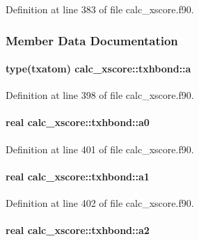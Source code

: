 Definition at line 383 of file calc\-\_\-xscore.\-f90.



\subsubsection{Member Data Documentation}
\hypertarget{structcalc__xscore_1_1txhbond_acb8f0f1efa056d3aa00e465f890da223}{
\paragraph[{a}]{\setlength{\rightskip}{0pt plus 5cm}type({\bf txatom}) calc\-\_\-xscore\-::txhbond\-::a}}\label{structcalc__xscore_1_1txhbond_acb8f0f1efa056d3aa00e465f890da223}


Definition at line 398 of file calc\-\_\-xscore.\-f90.

\hypertarget{structcalc__xscore_1_1txhbond_a2221410b6e6172dc69ff3f7f3d38a7f8}{
\paragraph[{a0}]{\setlength{\rightskip}{0pt plus 5cm}real calc\-\_\-xscore\-::txhbond\-::a0}}\label{structcalc__xscore_1_1txhbond_a2221410b6e6172dc69ff3f7f3d38a7f8}


Definition at line 401 of file calc\-\_\-xscore.\-f90.

\hypertarget{structcalc__xscore_1_1txhbond_a550fb9478e5cfa94cdad440db46fc2e8}{
\paragraph[{a1}]{\setlength{\rightskip}{0pt plus 5cm}real calc\-\_\-xscore\-::txhbond\-::a1}}\label{structcalc__xscore_1_1txhbond_a550fb9478e5cfa94cdad440db46fc2e8}


Definition at line 402 of file calc\-\_\-xscore.\-f90.

\hypertarget{structcalc__xscore_1_1txhbond_a16ab8c264282aa82297a86035b59dca6}{
\paragraph[{a2}]{\setlength{\rightskip}{0pt plus 5cm}real calc\-\_\-xscore\-::txhbond\-::a2}}\label{structcalc__xscore_1_1txhbond_a16ab8c264282aa82297a86035b59dca6}


